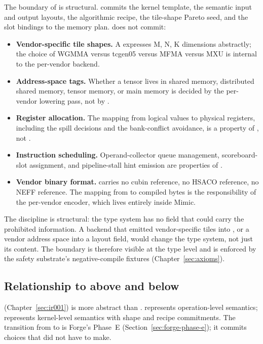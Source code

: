 The boundary of  is structural.
 commits the kernel template, the semantic input and output layouts, the algorithmic recipe, the tile-shape Pareto seed, and the slot bindings to the memory plan.
 does not commit:

\begin{itemize}
  \item \textbf{Vendor-specific tile shapes.}
        A  expresses M, N, K dimensions abstractly; the choice of WGMMA versus tcgen05 versus MFMA versus MXU is internal to the per-vendor backend.
  \item \textbf{Address-space tags.}
        Whether a tensor lives in shared memory, distributed shared memory, tensor memory, or main memory is decided by the per-vendor lowering pass, not by .
  \item \textbf{Register allocation.}
        The mapping from logical values to physical registers, including the spill decisions and the bank-conflict avoidance, is a property of , not .
  \item \textbf{Instruction scheduling.}
        Operand-collector queue management, scoreboard-slot assignment, and pipeline-stall hint emission are properties of .
  \item \textbf{Vendor binary format.}
         carries no cubin reference, no HSACO reference, no NEFF reference.
        The mapping from  to compiled bytes is the responsibility of the per-vendor encoder, which lives entirely inside Mimic.
\end{itemize}

The discipline is structural: the  type system has no field that could carry the prohibited information.
A backend that emitted vendor-specific tiles into , or a vendor address space into a  layout field, would change the  type system, not just its content.
The boundary is therefore visible at the type level and is enforced by the safety substrate's negative-compile fixtures (Chapter~\ref{sec:axioms}).

\subsection{Relationship to  above and  below}
\label{sec:ir002-relationships}

 (Chapter~\ref{sec:ir001}) is more abstract than .
 represents operation-level semantics;  represents kernel-level semantics with shape and recipe commitments.
The transition from  to  is Forge's Phase~E (Section~\ref{sec:forge-phase-e}); it commits choices that  did not have to make.

